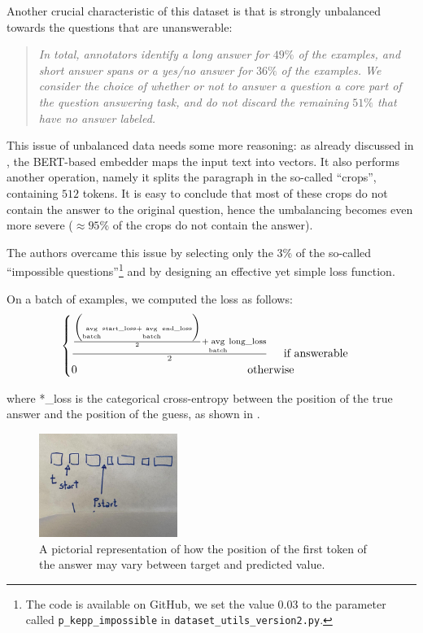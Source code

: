 \documentclass[10pt,hidelinks]{article}
\DeclareMathOperator*{\avg}{avg}
\begin{document}
Another crucial characteristic of this dataset is that is strongly unbalanced towards the questions that are unanswerable:
\blockquote{\it In total, annotators identify a long answer for $49\%$ of the examples, and short answer spans or a yes/no answer for $36\%$ of the examples. We consider the choice of whether or not to answer a question a core part of the question answering task, and do not discard the remaining $51\%$ that have no answer labeled.\cite{kwiatowski}}
	
This issue of unbalanced data needs some more reasoning: as already discussed in , the BERT-based embedder maps the input text into vectors. It also performs another operation, namely it splits the paragraph in the so-called ``crops'', containing $512$ tokens.
It is easy to conclude that most of these crops do not contain the answer to the original question, hence the umbalancing becomes even more severe ($\approx 95\%$ of the crops do not contain the answer).

The authors overcame this issue by selecting only the $3\%$ of the so-called ``impossible questions''\footnote{The code is available on GitHub, we set the value $0.03$ to the parameter called \texttt{p\_kepp\_impossible} in \texttt{dataset\_utils\_version2.py}.} and by designing an effective yet simple loss function.


On a batch of examples, we computed the loss as follows:
\[
\begin{cases}
\frac{\frac{\biggl ( \avg\limits_{\text{batch}} \text{start\_loss} + \avg\limits_{\text{batch}} \text{end\_loss}  \biggr )}{2} + \avg\limits_{\text{batch}} \text{long\_loss}}{2} \hspace{0.5cm}\text{if answerable}\\
0 \hspace{5.3cm} \text{otherwise}
\end{cases}
\]
 
 where *\_loss is the categorical cross-entropy between the position of the true answer and the position of the guess, as shown in .

\begin{figure}[ht!]
	\centering
	\includegraphics[width=0.4\textwidth]{pics/loss.jpg}
	\caption{A pictorial representation of how the position of the first token of the answer may vary between target and predicted value.}\label{fig:loss}
\end{figure}
\end{document}
